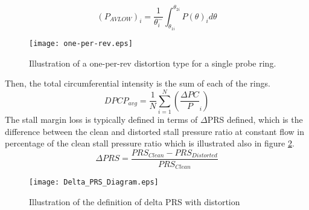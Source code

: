 				\begin{equation}(P_{AVLOW})_i = \frac{1}
					{\theta_i^-}\int_{\theta_{1i}}^{\theta_{2i}}{P(\theta)_i d\theta}
					\label{PaverageLow}
				\end{equation}%
				\begin{figure}[htp]
					\centering
					\texttt{[image: one-per-rev.eps]}
					\caption{Illustration of a one-per-rev distortion type for a single probe ring.}
					\label{One_Per_Rev_Diagram}
				\end{figure}	
				Then, the total circumferential intensity is the sum of each of the rings.  
				\begin{equation}
					DPCP_{avg} = \frac{1}{N} \sum\limits_{i=1}^{N}(\frac{\Delta PC}{P}_i)
					\label{DPCP_avg}
				\end{equation}%
				The stall margin loss is typically defined in terms of $\Delta$PRS defined, which is the difference between the clean and distorted stall pressure ratio at constant flow in percentage of the clean stall pressure ratio which is illustrated also in figure \ref{Delta_PRS_Diagram}.
				\begin{equation}
					\Delta PRS = \frac{PRS_{Clean}-PRS_{Distorted}}{PRS_{Clean}}
					\label{Delta_PRS_Equation}
				\end{equation}				
				\begin{figure}[htp]
					\centering
					\texttt{[image: Delta\_PRS\_Diagram.eps]}
					\caption{Illustration of the definition of delta PRS with distortion}
					\label{Delta_PRS_Diagram}
				\end{figure}	
				
